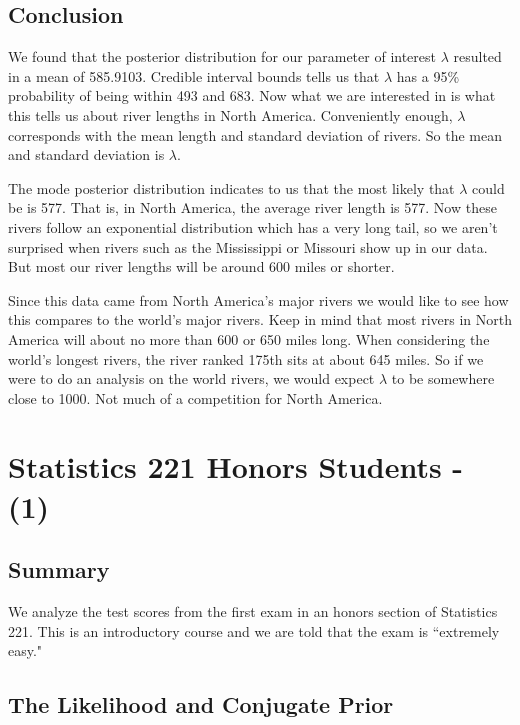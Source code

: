 \documentclass[12pt]{article}
\begin{document}
\subsection{Conclusion}

\noindent We found that the posterior distribution for our parameter of interest $\lambda$ resulted in a mean of 585.9103.  Credible interval bounds tells us that $\lambda$ has a 95\% probability of being within 493 and 683.  Now what we are interested in is what this tells us about river lengths in North America.  Conveniently enough, $\lambda$ corresponds with the mean length and standard deviation of rivers.  So the mean and standard deviation is $\lambda$.
\bigskip

\noindent The mode posterior distribution indicates to us that the most likely that $\lambda$ could be is 577.  That is, in North America, the average river length is 577.  Now these rivers follow an exponential distribution which has a very long tail, so we aren't surprised when rivers such as the Mississippi or Missouri show up in our data.  But most our river lengths will be around 600 miles or shorter.
\bigskip

\noindent Since this data came from North America's major rivers we would like to see how this compares to the world's major rivers.  Keep in mind that most rivers in North America will about no more than 600 or 650 miles long.  When considering the world's longest rivers, the river ranked 175th sits at about 645 miles.  So if we were to do an analysis on the world rivers, we would expect $\lambda$ to be somewhere close to 1000.  Not much of a competition for North America.

\newpage

\section{Statistics 221 Honors Students - (1)}

\subsection{Summary}

\noindent We analyze the test scores from the first exam in an honors section of Statistics 221.  This is an introductory course and we are told that the exam is ``extremely easy."

\subsection{The Likelihood and Conjugate Prior}
\end{document}
